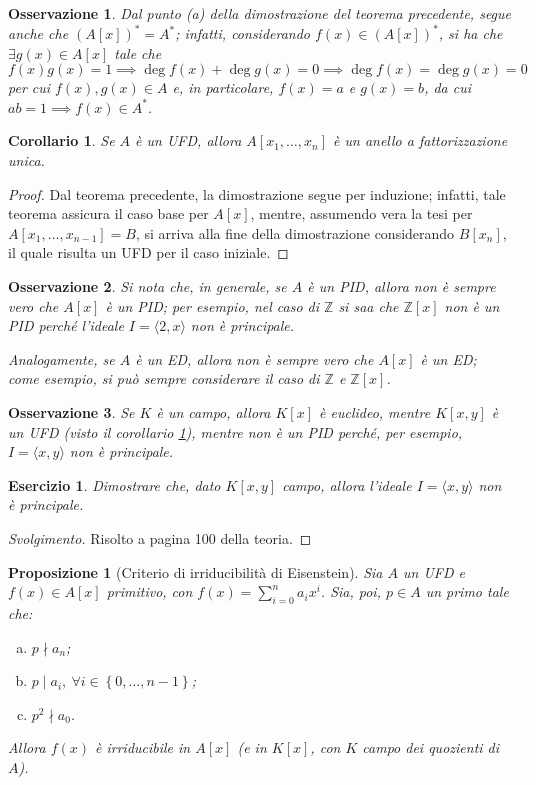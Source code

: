 \documentclass[11pt]{article}
\theoremstyle{style}
\newtheorem{prop}{Proposizione}[section]
\newtheorem{corollario}{Corollario}[teorema]
\newtheorem{osservazione}{Osservazione}[section]
\newtheorem{esercizio}{Esercizio}[section]
\newenvironment{svolgimento}{\renewcommand\qedsymbol{$\blacksquare$}\begin{proof}[Svolgimento]}{\end{proof}}
\numberwithin{equation}{subsection}
\begin{document}
\begin{osservazione}
	Dal punto (a) della dimostrazione del teorema precedente, segue anche che $(A[x])^* = A^*$; infatti, considerando $f(x) \in (A[x])^*$, si ha che $\exists g(x) \in A[x]$ tale che 
	\[
	f(x) g(x) = 1\implies \operatorname{deg} f(x) + \operatorname{deg} g(x) = 0\implies \operatorname{deg} f(x) = \operatorname{deg} g(x) = 0
	\] 
	per cui $f(x), g(x) \in A$ e, in particolare, $f(x) = a$ e $g(x) = b$, da cui $ab =1\implies f(x) \in A^*$.
\end{osservazione}
\begin{corollario}\label{corufdcat}
	Se $A$ \`e un UFD, allora $A[x_1,\ldots,x_n]$ \`e un anello a fattorizzazione unica.
\end{corollario}
	\begin{proof}
		Dal teorema precedente, la dimostrazione segue per induzione; infatti, tale teorema assicura il caso base per $A[x]$, mentre, assumendo vera la tesi per $A [x_1,\ldots,x_{n-1} ] = B$, si arriva alla fine della dimostrazione considerando $B[x_n]$, il quale risulta un UFD per il caso iniziale.
	\end{proof}
\begin{osservazione}
	Si nota che, in generale, se $A$ \`e un PID, allora non \`e sempre vero che $A[x]$ \`e un PID; per esempio, nel caso di $\mathbb{Z}$ si saa che $\mathbb{Z}[x]$ non \`e un PID perch\'e l'ideale $I = \langle 2,x \rangle$ non \`e principale.

	Analogamente, se $A$ \`e un ED, allora non \`e sempre vero che $A[x]$ \`e un ED; come esempio, si pu\`o sempre considerare il caso di $\mathbb{Z}$ e $\mathbb{Z}[x]$.
\end{osservazione}
\begin{osservazione}
	Se $K$ \`e un campo, allora $K[x]$ \`e euclideo, mentre $K[x,y]$ \`e un UFD (visto il corollario \ref{corufdcat}), mentre non \`e un PID perch\'e, per esempio, $I =\langle x,y \rangle$ non \`e principale.
\end{osservazione}
\begin{esercizio}
	Dimostrare che, dato $K[x,y]$ campo, allora l'ideale $I=\langle x,y \rangle$ non \`e principale.
\end{esercizio}
	\begin{svolgimento}
		Risolto a pagina 100 della teoria.
	\end{svolgimento}
\begin{prop}
	[Criterio di irriducibilit\`a di Eisenstein]
	Sia $A$ un UFD e $f(x) \in A[x]$ primitivo, con $f(x) = \sum_{i=0}^{n} a_ix^i$.
	Sia, poi, $p \in A$ un primo tale che:
	\begin{enumerate}[(a).]
		\item $p\nmid a_n$;
		\item $p  \mid a_i , \ \forall i \in \left\{ 0,\ldots,n-1 \right\} $;
		\item $p^2 \nmid a_0$.
	\end{enumerate}
	Allora $f(x)$ \`e irriducibile in $A[x]$ (e in $K[x]$, con $K$ campo dei quozienti di $A$).
\end{prop}
\end{document}
